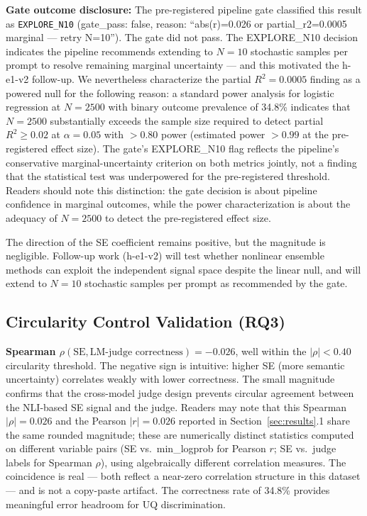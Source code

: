 \textbf{Gate outcome disclosure:} The pre-registered pipeline gate classified this result as \texttt{EXPLORE\_N10} (gate\_pass: false, reason: ``abs(r)=0.026 or partial\_r2=0.0005 marginal --- retry N=10''). The gate did not pass. The EXPLORE\_N10 decision indicates the pipeline recommends extending to $N=10$ stochastic samples per prompt to resolve remaining marginal uncertainty --- and this motivated the h-e1-v2 follow-up. We nevertheless characterize the partial $R^2=0.0005$ finding as a powered null for the following reason: a standard power analysis for logistic regression at $N=2500$ with binary outcome prevalence of 34.8\% indicates that $N=2500$ substantially exceeds the sample size required to detect partial $R^2\geq0.02$ at $\alpha=0.05$ with $>0.80$ power (estimated power $>0.99$ at the pre-registered effect size). The gate's EXPLORE\_N10 flag reflects the pipeline's conservative marginal-uncertainty criterion on both metrics jointly, not a finding that the statistical test was underpowered for the pre-registered threshold. Readers should note this distinction: the gate decision is about pipeline confidence in marginal outcomes, while the power characterization is about the adequacy of $N=2500$ to detect the pre-registered effect size.

The direction of the SE coefficient remains positive, but the magnitude is negligible. Follow-up work (h-e1-v2) will test whether nonlinear ensemble methods can exploit the independent signal space despite the linear null, and will extend to $N=10$ stochastic samples per prompt as recommended by the gate.

\subsection{Circularity Control Validation (RQ3)}

\textbf{Spearman $\rho(\text{SE}, \text{LM-judge correctness}) = -0.026$}, well within the $|\rho| < 0.40$ circularity threshold. The negative sign is intuitive: higher SE (more semantic uncertainty) correlates weakly with lower correctness. The small magnitude confirms that the cross-model judge design prevents circular agreement between the NLI-based SE signal and the judge. Readers may note that this Spearman $|\rho|=0.026$ and the Pearson $|r|=0.026$ reported in Section~\ref{sec:results}.1 share the same rounded magnitude; these are numerically distinct statistics computed on different variable pairs (SE vs.\ min\_logprob for Pearson $r$; SE vs.\ judge labels for Spearman $\rho$), using algebraically different correlation measures. The coincidence is real --- both reflect a near-zero correlation structure in this dataset --- and is not a copy-paste artifact. The correctness rate of 34.8\% provides meaningful error headroom for UQ discrimination.

